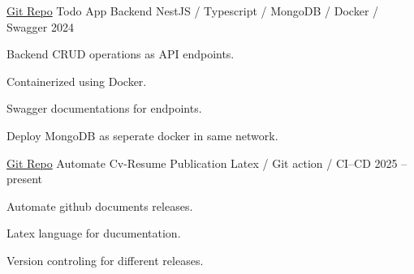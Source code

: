 \begin{cventries}
  \cventry
    {\href{https://github.com/drsamitha/TodoAPI}{Git Repo}} %
    {Todo App Backend} %
    {NestJS / Typescript / MongoDB / Docker / Swagger} %
    {2024} %
    {
      \begin{cvitems} %
        \item {Backend CRUD operations as API endpoints.}
        \item {Containerized using Docker.}
        \item {Swagger documentations for endpoints.}
        \item {Deploy MongoDB as seperate docker in same network.}
      \end{cvitems}
    }
 
  \cventry
    {\href{https://github.com/drsamitha/Awesome-CV}{Git Repo}} %
    {Automate Cv-Resume Publication} %
    {Latex / Git action / CI--CD} %
    {2025 -- present} %
    {
      \begin{cvitems} %
        \item {Automate github documents releases.}
        \item {Latex language for ducumentation.}
        \item {Version controling for different releases.}
      \end{cvitems}
    }


\end{cventries}
